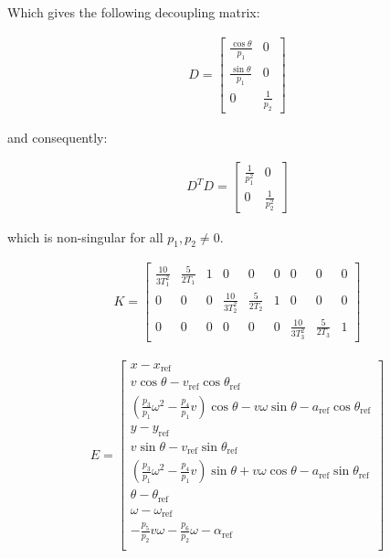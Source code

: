 \documentclass[letterpaper, 10 pt, conference]{ieeeconf}  %
\begin{document}
Which gives the following decoupling matrix:

\begin{eqnarray}
D = 
\left[\begin{array}{cc}
\frac{\cos\theta}{p_1} & 0\\
\frac{\sin\theta}{p_1} & 0\\
0 & \frac{1}{p_2}
\end{array}\right]
\end{eqnarray}

and consequently:

\begin{eqnarray}
D^TD = 
\left[\begin{array}{cc}
\frac{1}{p_1^2} & 0\\
0 & \frac{1}{p_2^2}
\end{array}\right]
\end{eqnarray}

which is non-singular for all $p_1, p_2 \neq 0$.

\begin{eqnarray}
K =
\left[\begin{array}{ccccccccc}
\frac{10}{3T_1^2} & \frac{5}{2T_1} & 1 & 0 & 0 & 0 & 0 & 0 & 0\\
0 & 0 & 0 & \frac{10}{3T_2^2} & \frac{5}{2T_2} & 1 & 0 & 0 & 0\\
0 & 0 & 0 & 0 & 0 & 0 & \frac{10}{3T_3^2} & \frac{5}{2T_3} & 1
\end{array}\right]
\end{eqnarray}

\begin{eqnarray}
E =
\left[\begin{array}{c}
x - x_{\text{ref}}\\
v\cos\theta - v_{\text{ref}}\cos\theta_{\text{ref}}\\
\left(\frac{p_3}{p_1}\omega^2 - \frac{p_4}{p_1}v\right)\cos\theta - v\omega\sin\theta - a_{\text{ref}}\cos{\theta_{\text{ref}}}\\
y - y_{\text{ref}}\\
v\sin\theta - v_{\text{ref}}\sin{\theta_{\text{ref}}}\\
\left(\frac{p_3}{p_1}\omega^2 - \frac{p_4}{p_1}v\right)\sin\theta + v\omega\cos\theta - a_{\text{ref}}\sin{\theta_{\text{ref}}}\\
\theta - \theta_{\text{ref}}\\
\omega - \omega_{\text{ref}}\\
-\frac{p_5}{p_2}v\omega - \frac{p_6}{p_2}\omega - \alpha_{\text{ref}}\\
\end{array}\right]
\end{eqnarray}
\end{document}

